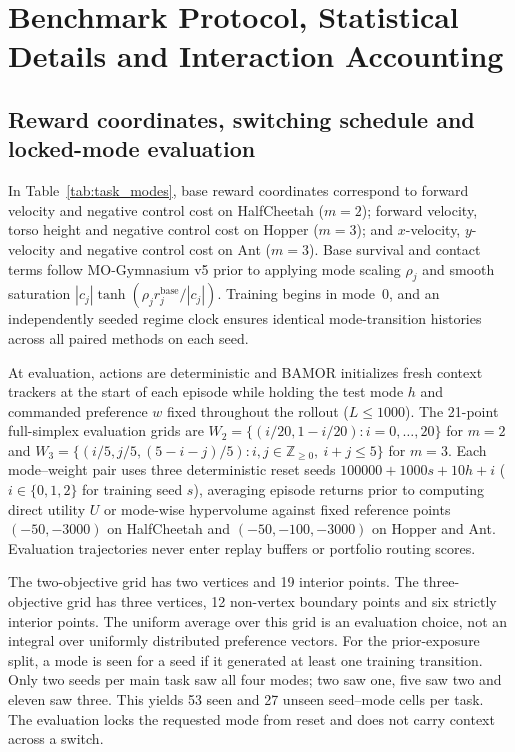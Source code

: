 \section{Benchmark Protocol, Statistical Details and Interaction Accounting}
\label{app:task_details}

\subsection{Reward coordinates, switching schedule and locked-mode evaluation}

In Table~\ref{tab:task_modes}, base reward coordinates correspond to forward
velocity and negative control cost on HalfCheetah ($m=2$); forward velocity,
torso height and negative control cost on Hopper ($m=3$); and $x$-velocity,
$y$-velocity and negative control cost on Ant ($m=3$). Base survival and
contact terms follow MO-Gymnasium v5 prior to applying mode scaling $\rho_j$
and smooth saturation $|c_j|\tanh(\rho_j r_j^{\mathrm{base}}/|c_j|)$. Training
begins in mode~0, and an independently seeded regime clock ensures identical
mode-transition histories across all paired methods on each seed.

At evaluation, actions are deterministic and BAMOR initializes fresh context
trackers at the start of each episode while holding the test mode $h$ and
commanded preference $w$ fixed throughout the rollout ($L \leq 1000$). The
21-point full-simplex evaluation grids are
$W_2 = \{(i/20, 1 - i/20) : i = 0, \ldots, 20\}$ for $m=2$ and
$W_3 = \{(i/5, j/5, (5 - i - j)/5) : i, j \in \mathbb{Z}_{\geq 0},\ i + j \leq 5\}$
for $m=3$. Each mode--weight pair uses three deterministic reset seeds
$100000 + 1000s + 10h + i$ ($i \in \{0, 1, 2\}$ for training seed $s$),
averaging episode returns prior to computing direct utility $U$ or mode-wise
hypervolume against fixed reference points $(-50, -3000)$ on HalfCheetah and
$(-50, -100, -3000)$ on Hopper and Ant. Evaluation trajectories never enter
replay buffers or portfolio routing scores.

The two-objective grid has two vertices and 19 interior points. The
three-objective grid has three vertices, 12 non-vertex boundary points and six
strictly interior points. The uniform average over this grid is an evaluation
choice, not an integral over uniformly distributed preference vectors.
For the prior-exposure split, a mode is seen for a seed if it generated at
least one training transition. Only two seeds per main task saw all four
modes; two saw one, five saw two and eleven saw three. This yields 53 seen
and 27 unseen seed--mode cells per task. The evaluation locks the requested
mode from reset and does not carry context across a switch.
